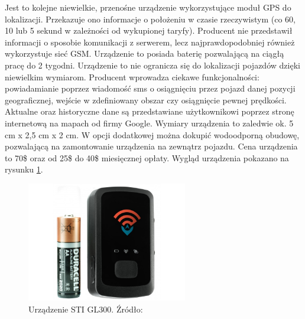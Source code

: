 \begin{itemize}
Jest to kolejne niewielkie, przenośne urządzenie wykorzystujące moduł GPS do lokalizacji. Przekazuje ono informacje o położeniu w czasie rzeczywistym (co 60, 10 lub 5 sekund w zależności od wykupionej taryfy). Producent nie przedstawił informacji o sposobie komunikacji z serwerem, lecz najprawdopodobniej również wykorzystuje sieć GSM. Urządzenie to posiada baterię pozwalającą na ciągłą pracę do 2 tygodni. Urządzenie to nie ogranicza się do lokalizacji pojazdów dzięki niewielkim wymiarom. Producent wprowadza ciekawe funkcjonalności: powiadamianie poprzez wiadomość sms o osiągnięciu przez pojazd danej pozycji geograficznej, wejście w zdefiniowany obszar czy osiągnięcie pewnej prędkości. Aktualne oraz historyczne dane są przedstawiane użytkownikowi poprzez stronę internetową na mapach od firmy Google.  Wymiary urządzenia to zaledwie ok. 5 cm x 2,5 cm x 2 cm.  W opcji dodatkowej można dokupić wodoodporną obudowę, pozwalającą na zamontowanie urządzenia na zewnątrz pojazdu. Cena urządzenia to 70\$ oraz od 25\$ do 40\$ miesięcznej opłaty. Wygląd urządzenia pokazano na rysunku \ref{fig:image_sti_gl300}.
\begin{figure}[h]
	\centering
	\includegraphics[width=7cm]{img/introduction/sti_gl300.jpg}
	\caption{Urządzenie STI GL300. Źródło: \cite{gl300}}
	\label{fig:image_sti_gl300}
\end{figure}
\end{itemize}